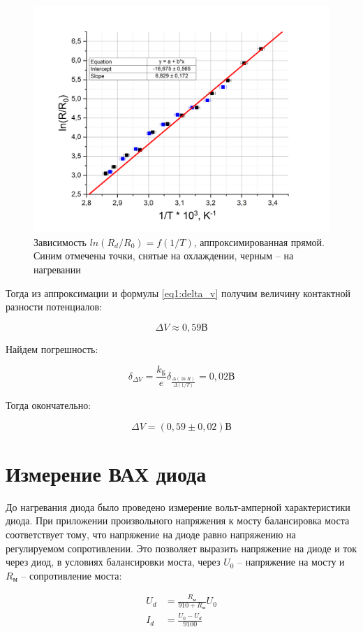 \documentclass[a4paper,12pt]{article}
\begin{document}
\begin{figure}[h!]
	\centering
	\includegraphics[width=0.8\linewidth]{contact_voltage_linear}
	\caption{Зависимость $ln(R_d/R_0) = f(1/T)$, аппроксимированная прямой. Синим отмечены точки, снятые на охлаждении, черным -- на нагревании}
\end{figure}

\newpage

Тогда из аппроксимации и формулы \ref{eq1:delta_v} получим величину контактной разности потенциалов:

$$
	\Delta V \approx 0,59 В
$$

Найдем погрешность:

$$
	\delta_{\Delta V} = \frac{k_Б}{e} \delta_{\frac{\Delta(\ln R)}{\Delta(1/T)}} = 0,02  В
$$

Тогда окончательно:

$$
	\Delta V = (0,59 \pm 0,02) В
$$

\section*{Измерение ВАХ диода}

До нагревания диода было проведено измерение вольт-амперной характеристики диода. При приложении произвольного напряжения к мосту балансировка моста соответствует тому, что напряжение на диоде равно напряжению на регулируемом сопротивлении. Это позволяет выразить напряжение на диоде и ток через диод, в условиях балансировки моста, через $U_0$ -- напряжение на мосту и $R_м$ -- сопротивление моста:

\begin{align*}
	U_d &= \frac{R_м}{910 + R_м} U_0 \\
	I_d &= \frac{U_0 - U_d}{9100}
\end{align*}
\end{document}
